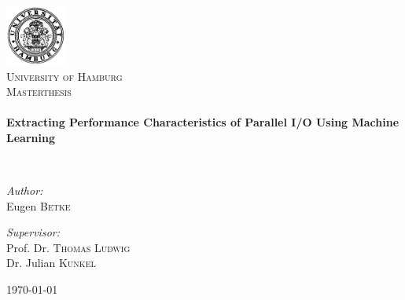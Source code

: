 \begin{titlepage}
\begin{center}
\includegraphics[width=0.15\textwidth]{unihh}\\[1cm]    

\textsc{\LARGE University of Hamburg}\\[1.5cm]

\textsc{\Large Masterthesis}\\[0.5cm]
\noindent\makebox[\linewidth]{\rule{\textwidth}{1pt}}\\[0.4cm]
{ \huge \bfseries Extracting Performance Characteristics of Parallel I/O Using Machine Learning}\\
\vspace{0.5cm}


\noindent\makebox[\linewidth]{\rule{\textwidth}{1pt}}\\[1.5cm]
\begin{minipage}{0.4\textwidth}
\begin{flushleft} \large
\emph{Author:}\\
Eugen \textsc{Betke}
\end{flushleft}
\end{minipage}
\begin{minipage}{0.4\textwidth}
\begin{flushright} \large
\emph{Supervisor:} \\
Prof. Dr. \textsc{Thomas Ludwig}\\
Dr. Julian \textsc{Kunkel}
\end{flushright}
\end{minipage}

\vfill

{\large \today}

\end{center}

\end{titlepage}
\restoregeometry
